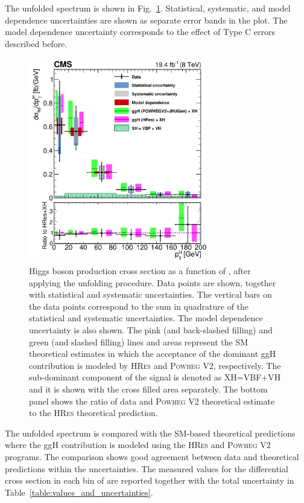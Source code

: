 The unfolded \pth spectrum is shown in Fig.~\ref{fig:unfolded}. Statistical, systematic, and model dependence uncertainties are shown as separate error bands in the plot. The model dependence uncertainty corresponds to the effect of Type C errors described before.
\begin{figure}[htb]
\centering
\includegraphics[width=0.7\textwidth]{images/unblinding/pthRatio_unfolded_paper.pdf}
\caption{Higgs boson production cross section as a function of \pth{}, after applying the unfolding procedure.
Data points are shown, together with statistical and systematic uncertainties. The vertical bars on the data points correspond to the sum in quadrature of the statistical and systematic uncertainties. The model dependence uncertainty is also shown.
The pink (and back-slashed filling) and green (and slashed filling) lines and areas represent the SM theoretical estimates in which the acceptance of the dominant ggH contribution is modeled by \textsc{HRes} and \textsc{Powheg V2}, respectively. The sub-dominant component of the signal is denoted as XH=VBF+VH and it is shown with the cross filled area separately. The bottom panel shows the ratio of data and \textsc{Powheg V2} theoretical estimate to the \textsc{HRes} theoretical prediction.}\label{fig:unfolded}
\end{figure}

The unfolded spectrum is compared with the SM-based theoretical predictions where the ggH contribution is modeled using the \textsc{HRes} and \textsc{Powheg V2} programs. The comparison shows good agreement between data and theoretical predictions within the uncertainties.
The measured values for the differential cross section in each bin of \pth are reported together with the total uncertainty in Table~\ref{table:values_and_uncertainties}.

